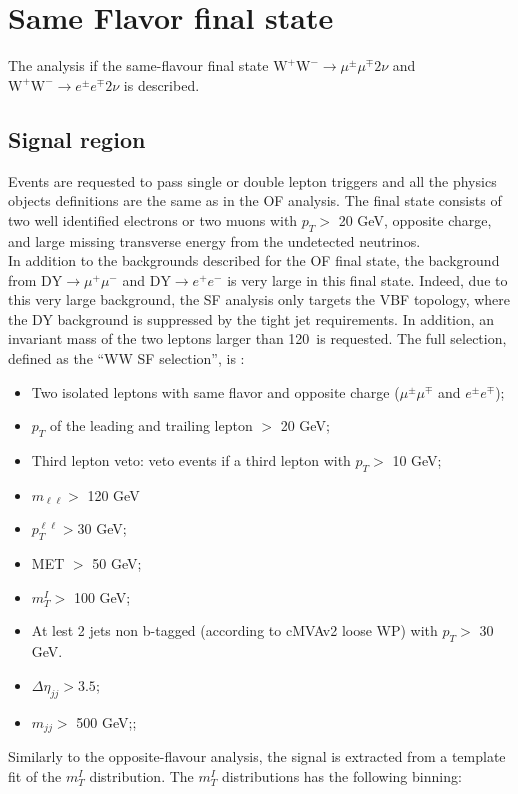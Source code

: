 \newpage
\section{Same Flavor final state}\label{sec:SF}
The analysis if the same-flavour final state $\mathrm{W^+W^-}\to \mu^{\pm}
\mu^{\mp}  2\nu$ and  $\mathrm{W^+W^-}\to e^{\pm} e^{\mp}  2\nu$ is described.
\subsection*{Signal region}
Events are requested to pass single or double lepton triggers and all the
physics objects definitions are the same as in the OF analysis.
The final state consists of two well identified electrons or two muons with
$p_T >$ 20 GeV, opposite charge, and large missing transverse energy from the undetected neutrinos.\\
In addition to the backgrounds described for the OF final state, the
background from $\mathrm{DY}\to \mu^{+} \mu^{-}$ and
$\mathrm{DY}\to e^{+} e^{-}$ is very large in this final state.
Indeed, due to this very large background, the SF analysis only targets the
VBF topology, where the DY background is suppressed by the tight 
jet requirements. In addition, an invariant mass of the two leptons larger
than 120~\GeV is requested.
The full selection, defined as the ``WW SF selection'', is :

\begin{itemize}
\item Two isolated leptons with same flavor and opposite charge ($\mu ^{\pm} \mu^{\mp}$ and $e^{\pm} e^{\mp}$);
\item $p_T$ of the leading and trailing lepton $>$ 20 GeV;
\item Third lepton veto: veto events if a third lepton with $p_T  >$ 10 GeV;
\item  $m_{\ell \ell} >$ 120 GeV 
\item $p_T^{\ell \ell} >$30 GeV;
\item MET $>$ 50 GeV;
\item $m_T^I >$ 100 GeV;
\item At lest 2 jets non b-tagged (according to cMVAv2 loose WP) with $p_T >$ 30 GeV.
\item $\Delta \eta_{jj} > 3.5$;
\item $m_{jj} >$ 500 GeV;;
\end{itemize}


Similarly to the opposite-flavour analysis, the signal is extracted from a template fit of
the $m_T^I$ distribution.
The $m_T^I$ distributions has the following binning:

